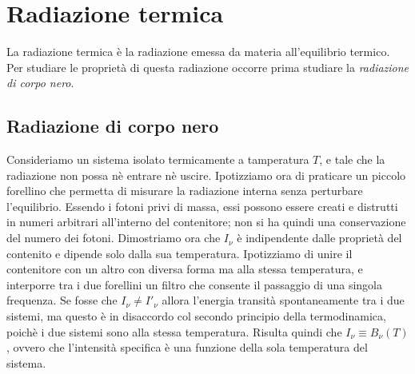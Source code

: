 \section{Radiazione termica}
La radiazione termica è la radiazione emessa da materia all'equilibrio termico. Per studiare le proprietà di questa radiazione occorre prima studiare la \textit{radiazione di corpo nero}.

\subsection{Radiazione di corpo nero}
Consideriamo un sistema isolato termicamente a tamperatura $T$, e tale che la radiazione non possa nè entrare nè uscire. Ipotizziamo ora di praticare un piccolo forellino che permetta di misurare la radiazione interna senza perturbare l'equilibrio. Essendo i fotoni privi di massa, essi possono essere creati e distrutti in numeri arbitrari  all'interno del contenitore; non si ha quindi una conservazione del numero dei fotoni. 
Dimostriamo ora che $I_\nu$ è indipendente dalle proprietà del contenito e dipende solo dalla sua temperatura. Ipotizziamo di unire il contenitore con un altro con diversa forma ma alla stessa temperatura, e interporre tra i due forellini un filtro che consente il passaggio di una singola frequenza. Se fosse che $I_\nu \neq I'_\nu$ allora l'energia transità spontaneamente tra i due sistemi, ma questo è in disaccordo col secondo principio della termodinamica, poichè i due sistemi sono alla stessa temperatura. Risulta quindi che $I_\nu \equiv B_\nu(T)$, ovvero che l'intensità specifica è una funzione della sola temperatura del sistema. 

